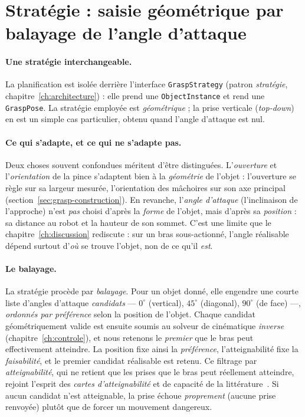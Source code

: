 \section{Stratégie : saisie géométrique par balayage de l'angle d'attaque}
\label{sec:grasp-strategie}

\paragraph{Une stratégie interchangeable.} La planification est isolée derrière l'interface \texttt{GraspStrategy} (patron \emph{stratégie}, chapitre~\ref{ch:architecture}) : elle prend une \texttt{ObjectInstance} et rend une \texttt{GraspPose}. La stratégie employée est \emph{géométrique} ; la prise verticale (\emph{top-down}) en est un simple cas particulier, obtenu quand l'angle d'attaque est nul.

\paragraph{Ce qui s'adapte, et ce qui ne s'adapte pas.} Deux choses souvent confondues méritent d'être distinguées. L'\emph{ouverture} et l'\emph{orientation} de la pince s'adaptent bien à la \emph{géométrie} de l'objet : l'ouverture se règle sur sa largeur mesurée, l'orientation des mâchoires sur son axe principal (section~\ref{sec:grasp-construction}). En revanche, l'\emph{angle d'attaque} (l'inclinaison de l'approche) n'est \emph{pas} choisi d'après la \emph{forme} de l'objet, mais d'après sa \emph{position} : sa distance au robot et la hauteur de son sommet. C'est une limite que le chapitre~\ref{ch:discussion} rediscute : sur un bras sous-actionné, l'angle réalisable dépend surtout d'\emph{où} se trouve l'objet, non de ce qu'il \emph{est}.

\paragraph{Le balayage.} La stratégie procède par \emph{balayage}. Pour un objet donné, elle engendre une courte liste d'angles d'attaque \emph{candidats} --- $0^{\circ}$ (vertical), $45^{\circ}$ (diagonal), $90^{\circ}$ (de face) ---, \emph{ordonnés par préférence} selon la position de l'objet. Chaque candidat géométriquement valide est ensuite soumis au solveur de cinématique \emph{inverse} (chapitre~\ref{ch:controle}), et nous retenons le \emph{premier} que le bras peut effectivement atteindre. La position fixe ainsi la \emph{préférence}, l'atteignabilité fixe la \emph{faisabilité}, et le premier candidat réalisable est retenu. Ce filtrage par \emph{atteignabilité}, qui ne retient que les prises que le bras peut réellement atteindre, rejoint l'esprit des \emph{cartes d'atteignabilité} et de capacité de la littérature~\cite{zacharias_capturing_2007, vahrenkamp_robot_2013}. Si aucun candidat n'est atteignable, la prise échoue \emph{proprement} (aucune prise renvoyée) plutôt que de forcer un mouvement dangereux.

